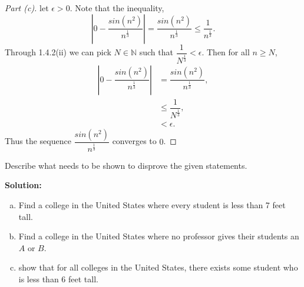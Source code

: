 \documentclass[12pt]{article}
\makeatletter
\theoremstyle{homework}
\newenvironment{exercise}[1]
{\def\@currentlabel{#1}\exercisecore}
{\endexercisecore}
\newcommand{\localhead}[1]{\par\smallskip\noindent\textbf{#1}\nobreak\\}%
\newcommand\solution{\localhead{Solution:}}
\newcommand{\Nats}{\ensuremath{\mathbb N}}
\makeatother
\begin{document}
\begin{proof}[Part (c)]let $\epsilon > 0$. Note that the inequality,
	\begin{equation*}
		|0 - \dfrac{sin(n^2)}{n^\frac{1}{3}}| = \dfrac{sin(n^2)}{n^\frac{1}{3}} \le \dfrac{1}{n^\frac{1}{3}}. 
	\end{equation*}
	Through 1.4.2(ii) we can pick $N \in \Nats$ such that $\dfrac{1}{N^\frac{1}{3}}<\epsilon$. Then for all $n \geq N$,
	\begin{align*}
		|0 - \dfrac{sin(n^2)}{n^\frac{1}{3}}| &= \dfrac{sin(n^2)}{n^\frac{1}{3}},\\
		&\le \dfrac{1}{N^\frac{1}{3}},\\
		&< \epsilon.
	\end{align*}
	Thus the sequence $\dfrac{sin(n^2)}{n^\frac{1}{3}}$ converges to $0$.  
\end{proof}

\begin{exercise}{2.2.3}
Describe what needs to be shown to disprove the given statements.
\end{exercise}
\solution
\begin{enumerate}[(a)]
\item Find a college in the United States where every student is less than 7 feet tall.
\item Find a college in the United States where no professor gives their students an $A$ or $B$.
\item show that for all colleges in the United States, there exists some student who is less than 6 feet tall.
\end{enumerate}
\end{document}
